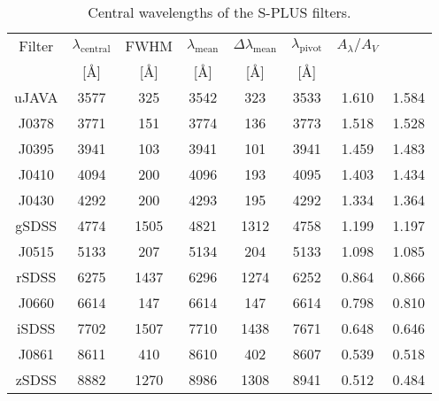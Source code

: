 \begin{table*}
\centering
\caption{Central wavelengths of the S-PLUS filters.}
\label{tab:central_wavelengths}
\begin{tabular}{ccccccc}
\hline
\hline
Filter & $\lambda_{\mathrm{central}}$ & FWHM & $\lambda_{\mathrm{mean}}$ & $\Delta\lambda_{\mathrm{mean}}$ & $\lambda_{\mathrm{pivot}}$ & $A_{\lambda}/A_{V}$ \\
 & [\AA] & [\AA] & [\AA] & [\AA] & [\AA] & \\
\hline
uJAVA & 3577 & 325 & 3542 & 323 & 3533 & 1.610 & 1.584\\
J0378 & 3771 & 151 & 3774 & 136 & 3773 & 1.518 & 1.528\\
J0395 & 3941 & 103 & 3941 & 101 & 3941 & 1.459 & 1.483\\
J0410 & 4094 & 200 & 4096 & 193 & 4095 & 1.403 & 1.434\\
J0430 & 4292 & 200 & 4293 & 195 & 4292 & 1.334 & 1.364\\
gSDSS & 4774 & 1505 & 4821 & 1312 & 4758 & 1.199 & 1.197\\
J0515 & 5133 & 207 & 5134 & 204 & 5133 & 1.098 & 1.085\\
rSDSS & 6275 & 1437 & 6296 & 1274 & 6252 & 0.864 & 0.866\\
J0660 & 6614 & 147 & 6614 & 147 & 6614 & 0.798 & 0.810\\
iSDSS & 7702 & 1507 & 7710 & 1438 & 7671 & 0.648 & 0.646\\
J0861 & 8611 & 410 & 8610 & 402 & 8607 & 0.539 & 0.518\\
zSDSS & 8882 & 1270 & 8986 & 1308 & 8941 & 0.512 & 0.484\\
\hline
\end{tabular}
\end{table*}
